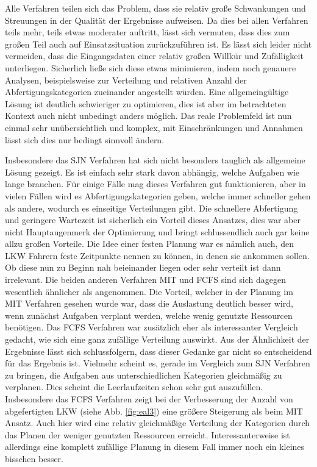 Alle Verfahren teilen sich das Problem, dass sie relativ große Schwankungen und Streuungen in der Qualität der Ergebnisse aufweisen. Da dies bei allen Verfahren teils mehr, teils etwas moderater auftritt, lässt sich vermuten, dass dies zum großen Teil auch auf Einsatzsituation zurückzuführen ist. Es lässt sich leider nicht vermeiden, dass die Eingangsdaten einer relativ großen Willkür und Zufälligkeit unterliegen. Sicherlich ließe sich diese etwas minimieren, indem noch genauere Analysen, beispielsweise zur Verteilung und relativen Anzahl der Abfertigungskategorien zueinander angestellt würden. Eine allgemeingültige Lösung ist deutlich schwieriger zu optimieren, dies ist aber im betrachteten Kontext auch nicht unbedingt anders möglich. Das reale Problemfeld ist nun einmal sehr unübersichtlich und komplex, mit Einschränkungen und Annahmen lässt sich dies nur bedingt sinnvoll ändern.

Insbesondere das SJN Verfahren hat sich nicht besonders tauglich als allgemeine Lösung gezeigt. Es ist einfach sehr stark davon abhängig, welche Aufgaben wie lange brauchen. Für einige Fälle mag dieses Verfahren gut funktionieren, aber in vielen Fällen wird es Abfertigungskategorien geben, welche immer schneller gehen als andere, wodurch es einseitige Verteilungen gibt. Die schnellere Abfertigung und geringere Wartezeit ist sicherlich ein Vorteil dieses Ansatzes, dies war aber nicht Hauptaugenmerk der Optimierung und bringt schlussendlich auch gar keine allzu großen Vorteile. Die Idee einer festen Planung war es nämlich auch, den LKW Fahrern feste Zeitpunkte nennen zu können, in denen sie ankommen sollen. Ob diese nun zu Beginn nah beieinander liegen oder sehr verteilt ist dann irrelevant. Die beiden anderen Verfahren MIT und FCFS sind sich dagegen wesentlich ähnlicher als angenommen. Die Vorteil, welcher in der Planung im MIT Verfahren gesehen wurde war, dass die Auslastung deutlich besser wird, wenn zunächst Aufgaben verplant werden, welche wenig genutzte Ressourcen benötigen. Das FCFS Verfahren war zusätzlich eher als interessanter Vergleich gedacht, wie sich eine ganz zufällige Verteilung auswirkt. Aus der Ähnlichkeit der Ergebnisse lässt sich schlussfolgern, dass dieser Gedanke gar nicht so entscheidend für das Ergebnis ist. Vielmehr scheint es, gerade im Vergleich zum SJN Verfahren zu bringen, die Aufgaben aus unterschiedlichen Kategorien gleichmäßig zu verplanen. Dies scheint die Leerlaufzeiten schon sehr gut auszufüllen. Insbesondere das FCFS Verfahren zeigt bei der Verbesserung der Anzahl von abgefertigten LKW (siehe Abb. \ref{fig:eal3}) eine größere Steigerung als beim MIT Ansatz. Auch hier wird eine relativ gleichmäßige Verteilung der Kategorien durch das Planen der weniger genutzten Ressourcen erreicht. Interessanterweise ist allerdings eine komplett zufällige Planung in diesem Fall immer noch ein kleines bisschen besser. 


